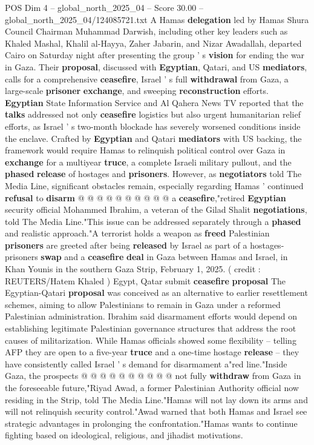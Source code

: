 \begin{textsample}{POS Dim 4 – global\_north\_2025\_04 – Score 30.00 – global\_north\_2025\_04/124085721.txt}  \label{ex:f4_pos_221}
A Hamas \textbf{delegation} led by Hamas Shura Council Chairman Muhammad Darwish, including other key leaders such as Khaled Mashal, Khalil al-Hayya, Zaher Jabarin, and Nizar Awadallah, departed Cairo on Saturday night after presenting the group ' s \textbf{vision} for ending the war in Gaza.
Their \textbf{proposal}, discussed with \textbf{Egyptian}, Qatari, and US \textbf{mediators}, calls for a comprehensive \textbf{ceasefire}, Israel ' s full \textbf{withdrawal} from Gaza, a large-scale \textbf{prisoner} \textbf{exchange}, and sweeping \textbf{reconstruction} efforts. \textbf{Egyptian} State Information Service and Al Qahera News TV reported that the \textbf{talks} addressed not only \textbf{ceasefire} logistics but also urgent humanitarian relief efforts, as Israel ' s two-month blockade has severely worsened conditions inside the enclave.
Crafted by \textbf{Egyptian} and Qatari \textbf{mediators} with US backing, the framework would require Hamas to relinquish political control over Gaza in \textbf{exchange} for a multiyear \textbf{truce}, a complete Israeli military pullout, and the \textbf{phased} \textbf{release} of hostages and \textbf{prisoners}.
However, as \textbf{negotiators} told The Media Line, significant obstacles remain, especially regarding Hamas ' continued \textbf{refusal} to \textbf{disarm} @ @ @ @ @ @ @ @ @ @ a \textbf{ceasefire},"retired \textbf{Egyptian} security official Mohammed Ibrahim, a veteran of the Gilad Shalit \textbf{negotiations}, told The Media Line."This issue can be addressed separately through a \textbf{phased} and realistic approach."A terrorist holds a weapon as \textbf{freed} Palestinian \textbf{prisoners} are greeted after being \textbf{released} by Israel as part of a hostages-prisoners \textbf{swap} and a \textbf{ceasefire} \textbf{deal} in Gaza between Hamas and Israel, in Khan Younis in the southern Gaza Strip, February 1, 2025. ( credit : REUTERS/Hatem Khaled ) Egypt, Qatar submit \textbf{ceasefire} \textbf{proposal} The Egyptian-Qatari \textbf{proposal} was conceived as an alternative to earlier resettlement schemes, aiming to allow Palestinians to remain in Gaza under a reformed Palestinian administration.
Ibrahim said disarmament efforts would depend on establishing legitimate Palestinian governance structures that address the root causes of militarization.
While Hamas officials showed some flexibility -- telling AFP they are open to a five-year \textbf{truce} and a one-time hostage \textbf{release} -- they have consistently called Israel ' s demand for disarmament a"red line."Inside Gaza, the prospects @ @ @ @ @ @ @ @ @ @ not fully \textbf{withdraw} from Gaza in the foreseeable future,"Riyad Awad, a former Palestinian Authority official now residing in the Strip, told The Media Line."Hamas will not lay down its arms and will not relinquish security control."Awad warned that both Hamas and Israel see strategic advantages in prolonging the confrontation."Hamas wants to continue fighting based on ideological, religious, and jihadist motivations.

\end{textsample}
